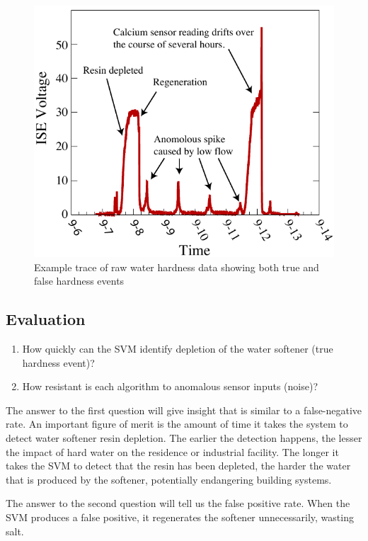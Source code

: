 \begin{figure}
\centering
\includegraphics{water/hardness-snapshot.pdf}
\caption{Example trace of raw water hardness data showing both true and false hardness events}
\label{fig:example_trace_water_hardness}
\end{figure}

\subsection{Evaluation}
\label{sec:water_hardness_evaluation}

\begin{enumerate}
\item How quickly can the SVM identify depletion of the water softener (true hardness event)?
\item How resistant is each algorithm to anomalous sensor inputs (noise)?
\end{enumerate}

The answer to the first question will give insight that is similar to a false-negative rate.
 An important figure of merit is the amount of time it takes the system to detect water softener resin depletion.
 The earlier the detection happens, the lesser the impact of hard water on the residence or industrial facility.
 The longer it takes the SVM to detect that the resin has been depleted, the harder the water that is produced by the softener, potentially endangering building systems.

The answer to the second question will tell us the false positive rate.
 When the SVM produces a false positive, it regenerates the softener unnecessarily, wasting salt.

